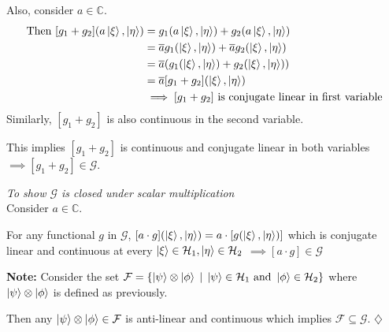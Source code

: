 \documentclass[12pt,twoside,fleqn]{report}
\makeatletter
\theoremstyle{thmstyle}
\renewenvironment{proof}[1][\proofname]{\par
\pushQED{\qed}%
\normalfont \topsep6\p@\@plus6\p@\relax
\trivlist
\item[\hskip\labelsep\itshape#1\@addpunct{.}]\mbox{}\par\nobreak\ignorespaces
}{%
    \popQED\endtrivlist\@endpefalse
    }
\newenvironment{note}{\textbf{Note:}}{\hfill\ensuremath{\diamondsuit}}
\makeatother
\begin{document}
\begin{proof}
    Also, consider $a \in \mathbb{C}$. 
    \begin{align*}
        \text{Then }[g_1 + g_2](a \ket\xi, \ket\eta) & = g_1(a \ket\xi, \ket\eta) + g_2(a \ket\xi, \ket\eta)
        \\ & = \overline{a} g_1(\ket\xi, \ket\eta) + \overline{a} g_2(\ket\xi, \ket\eta) 
        \\ & = \overline{a} (g_1(\ket\xi, \ket\eta) + g_2(\ket\xi,\ket\eta))
        \\ & = \overline{a}[g_1 + g_2](\ket\xi, \ket\eta)
        \\ & \implies [g_1 + g_2] \text{ is conjugate linear in first variable}
    \end{align*}
    Similarly, $[g_1 + g_2]$ is also continuous in the second variable. 

    This implies $[g_1 + g_2]$ is continuous and conjugate linear in both variables $\implies [g_1 + g_2] \in \mathcal{G}$.



    \emph{To show $\mathcal{G}$ is closed under scalar multiplication} \\
    Consider $a \in \mathbb{C}$.

    For any functional $g$ in $\mathcal{G}$, $[a \cdot g](\ket\xi, \ket\eta) = a \cdot [ g(\ket\xi, \ket\eta) ]$ which is conjugate linear and continuous at every $\ket\xi \in \mathcal{H}_1, \ket\eta \in \mathcal{H}_2$ $\implies [a \cdot g] \in \mathcal{G}$
\end{proof}

\begin{note}
    Consider the set $\mathcal{F} = \{ \ket\psi \otimes \ket\phi \; | \; \ket\psi \in \mathcal{H}_1 \text{ and } \ket\phi \in \mathcal{H}_2 \}$ where $\ket\psi \otimes \ket\phi$ is defined as previously.

    Then any $\ket\psi \otimes \ket\phi \in \mathcal{F}$ is anti-linear and continuous which implies $\mathcal{F} \subseteq \mathcal{G}$.
\end{note}
\end{document}
